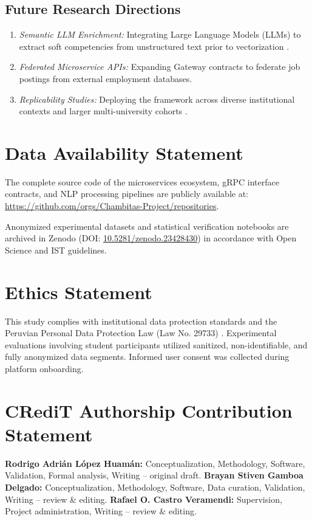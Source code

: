 \documentclass[a4paper,fleqn]{cas-dc}
\begin{document}
\subsection{Future Research Directions}
\begin{enumerate}
    \item \textit{Semantic LLM Enrichment:} Integrating Large Language Models (LLMs) to extract soft competencies from unstructured text prior to vectorization \cite{bisschoff2025}.
    \item \textit{Federated Microservice APIs:} Expanding Gateway contracts to federate job postings from external employment databases.
    \item \textit{Replicability Studies:} Deploying the framework across diverse institutional contexts and larger multi-university cohorts \cite{song2022, dlouhy2025}.
\end{enumerate}

\section*{Data Availability Statement}
The complete source code of the microservices ecosystem, gRPC interface contracts, and NLP processing pipelines are publicly available at:
\url{https://github.com/orgs/Chambitas-Project/repositories}.

Anonymized experimental datasets and statistical verification notebooks are archived in Zenodo (DOI: \href{https://doi.org/10.5281/zenodo.23428430}{10.5281/zenodo.23428430}) in accordance with Open Science and IST guidelines.

\section*{Ethics Statement}
This study complies with institutional data protection standards and the Peruvian Personal Data Protection Law (Law No. 29733) \cite{ley29733}. Experimental evaluations involving student participants utilized sanitized, non-identifiable, and fully anonymized data segments. Informed user consent was collected during platform onboarding.

\section*{CRediT Authorship Contribution Statement}
\textbf{Rodrigo Adri{\'a}n L{\'o}pez Huam{\'a}n:} Conceptualization, Methodology, Software, Validation, Formal analysis, Writing -- original draft. \textbf{Brayan Stiven Gamboa Delgado:} Conceptualization, Methodology, Software, Data curation, Validation, Writing -- review \& editing. \textbf{Rafael O. Castro Veramendi:} Supervision, Project administration, Writing -- review \& editing.
\end{document}
